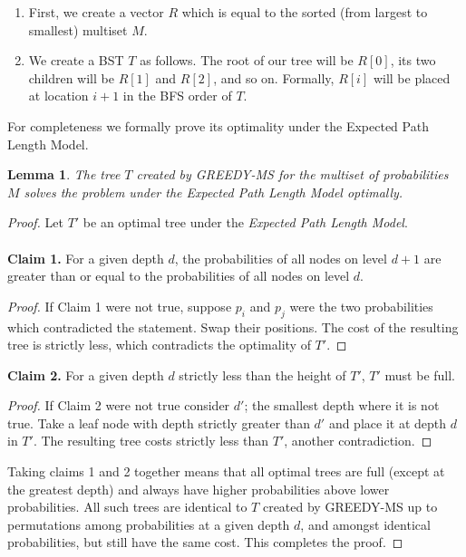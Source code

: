 \documentclass[letterpaper,12pt,titlepage,oneside,final]{book}
\theoremstyle{plain}
\newtheorem{lem}[thm]{Lemma}
\begin{document}
\begin{enumerate}
\item First, we create a vector $R$ which is equal to the sorted (from largest to smallest) multiset $M$.

\item We create a BST $T$ as follows. The root of our tree will be $R[0]$, its two children will be $R[1]$ and $R[2]$, and so on. Formally, $R[i]$ will be placed at location $i+1$ in the BFS order of $T$.
\end{enumerate}

For completeness we formally prove its optimality under the Expected Path Length Model. 

\begin{lem}\label{MSSolvesOpt}
The tree $T$ created by GREEDY-MS for the multiset of probabilities $M$ solves the problem under the \textit{Expected Path Length Model} optimally.
\end{lem}

\begin{proof}
Let $T'$ be an optimal tree under the \textit{Expected Path Length Model}. \\\\
\noindent \textbf{Claim 1.}\label{Claim-EPL}
For a given depth $d$, the probabilities of all nodes on level $d+1$ are greater than or equal to the probabilities of all nodes on level $d$.
\begin{proof}
If Claim 1 were not true, suppose $p_i$ and $p_j$ were the two probabilities which contradicted the statement. Swap their positions. The cost of the resulting tree is strictly less, which contradicts the optimality of $T'$.
\end{proof}

\noindent \textbf{Claim 2.}\label{Claim-EPL2}
For a given depth $d$ strictly less than the height of $T'$, $T'$ must be full.
\begin{proof}
If Claim 2 were not true consider $d'$; the smallest depth where it is not true. Take a leaf node with depth strictly greater than $d'$ and place it at depth $d$ in $T'$. The resulting tree costs strictly less than $T'$, another contradiction.
\end{proof}

Taking claims 1 and 2 together means that all optimal trees are full (except at the greatest depth) and always have higher probabilities above lower probabilities. All such trees are identical to $T$ created by GREEDY-MS up to permutations among probabilities at a given depth $d$, and amongst identical probabilities, but still have the same cost. This completes the proof.

\end{proof}
\end{document}
